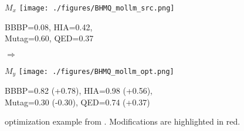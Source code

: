 \begin{figure}[t!]
    \centering
    \begin{minipage}{0.43\linewidth}
        \centering
        \tiny $M_x$
        \texttt{[image: ./figures/BHMQ\_mollm\_src.png]}
        \par\vspace{2pt}
        \tiny BBBP=0.08, HIA=0.42, \\
        \tiny Mutag=0.60, QED=0.37
    \end{minipage}
    \hfill
    \begin{minipage}{0.05\linewidth}
        \centering
        \Large$\Rightarrow$\\
        \tiny \mollm
    \end{minipage}
    \hfill
    \begin{minipage}{0.43\linewidth}
        \centering
        \tiny $M_y$
        \texttt{[image: ./figures/BHMQ\_mollm\_opt.png]}
        \par\vspace{2pt}
        \tiny BBBP=0.82 (+0.78), HIA=0.98 (+0.56),\\ 
        \tiny Mutag=0.30 (-0.30), QED=0.74 (+0.37)
    \end{minipage}
    \caption{{\mollmSixGenM} optimization example from \BHMQ. Modifications are highlighted in red.}
    \label{fig:case_BHMQ}

    \vspace{-15pt}
\end{figure}
